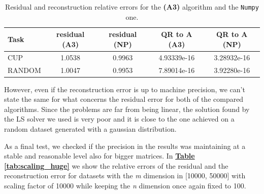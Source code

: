 \begin{table}[H]
    \begin{center}
    \begin{adjustwidth}{-0.4cm}{}
    \begin{center}
    \begin{tabular}{|P{2.cm}||c|c|c|c|}
        \hline
         \textbf{Task} & \textbf{residual (A3)} & \textbf{residual (NP)} & \textbf{QR to A (A3)} & \textbf{QR to A (NP)}\\ [0.5ex]
         \hline\hline
        CUP & 1.0538 & 0.9963 &  4.93339e-16 & 3.28932e-16\\
        \hline
        RANDOM & 1.0047 & 0.9953 & 7.89014e-16 & 3.92280e-16\\
        \hline
    \end{tabular}
    \end{center}
    \end{adjustwidth}
    \caption{Residual and reconstruction relative errors for the \textbf{(A3)} algorithm and the \texttt{Numpy} one.}
    \label{tab:cup_res_direct}
    \end{center}
\end{table}

However, even if the reconstruction error is up to machine precision, we can't state the same for what concerns the residual error for both of the compared algorithms. Since the problems are far from being linear, the solution found by the LS solver we used is very poor and it is close to the one achieved on a random dataset generated with a gaussian distribution.

As a final test, we checked if the precision in the results was maintaining at a stable and reasonable level also for bigger matrices. In \hyperref[tab:scaling_huge]{\textbf{Table \ref{tab:scaling_huge}}} we show the relative errors of the residual and the reconstruction error for datasets with the \textit{m} dimension in [10000, 50000] with scaling factor of 10000 while keeping the \textit{n} dimension once again fixed to 100.


